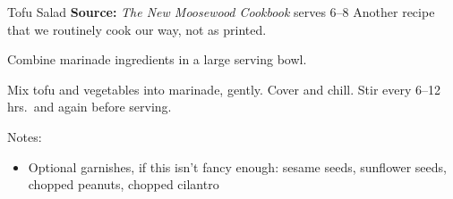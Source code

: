 \begin{recipe}[]{Tofu Salad}%
 {\textbf{Source:} \textit{The New Moosewood Cookbook} \hfill serves 6--8}
 \freeform Another recipe that we routinely cook our way, not as printed.

 Combine marinade ingredients in a large serving bowl.

 Mix tofu and vegetables into marinade, gently. Cover and chill. Stir every 6--12 hrs.\ and again before serving.

 \freeform Notes:
 \begin{itemize}
  \item Optional garnishes, if this isn't fancy enough: sesame seeds, sunflower seeds, chopped peanuts, chopped cilantro
 \end{itemize}

\end{recipe}

